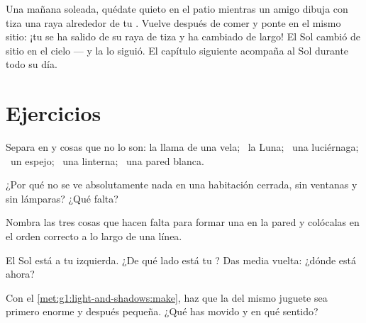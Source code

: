 \begin{example}\label{ex:g1:light-and-shadows:chalk}
Una mañana soleada, quédate quieto en el patio mientras un amigo
dibuja con tiza una raya alrededor de tu . Vuelve después de
comer y ponte en el mismo sitio: ¡tu  se ha salido de su raya
de tiza y ha cambiado de largo! El Sol cambió de sitio en el cielo ---
y la  lo siguió. El capítulo siguiente acompaña al Sol
durante todo su día.
\end{example}

\section{Ejercicios}

\begin{exercise}[$\star$]\label{exo:g1:light-and-shadows:1}
Separa en  y cosas que no lo son: la llama de una
vela; \ la Luna; \ una luciérnaga; \ un espejo; \ una linterna; \ una
pared blanca.
\end{exercise}

\begin{exercise}[$\star$]\label{exo:g1:light-and-shadows:2}
¿Por qué no se ve absolutamente nada en una habitación cerrada, sin
ventanas y sin lámparas? ¿Qué falta?
\end{exercise}

\begin{exercise}[$\star$]\label{exo:g1:light-and-shadows:3}
Nombra las tres cosas que hacen falta para formar una  en la
pared y colócalas en el orden correcto a lo largo de una línea.
\end{exercise}

\begin{exercise}[$\star$]\label{exo:g1:light-and-shadows:4}
El Sol está a tu izquierda. ¿De qué lado está tu ? Das media
vuelta: ¿dónde está ahora?
\end{exercise}

\begin{exercise}[$\star$]\label{exo:g1:light-and-shadows:5}
Con el \cref{met:g1:light-and-shadows:make}, haz que la  del
mismo juguete sea primero enorme y después pequeña. ¿Qué has movido y
en qué sentido?
\end{exercise}

